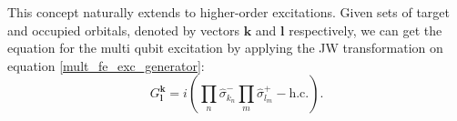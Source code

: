 \cite[Chapter IV.A.1.b.]{anand2022quantum}

This concept naturally extends to higher-order excitations. Given sets of target and occupied orbitals, denoted by vectors $\boldsymbol{k}$ and $\boldsymbol{l}$ respectively, we can get the equation for the multi qubit excitation by applying the JW transformation on equation \eqref{mult_fe_exc_generator}:
\begin{equation}
    \label{mult_qu_exc_generator}
    G^{\boldsymbol{k}}_{\boldsymbol{l}} = i\left(\prod_n \hat{\sigma}^-_{k_n} \prod_m \hat{\sigma}^+_{l_m} - \text{h.c.} \right).
\end{equation}






















